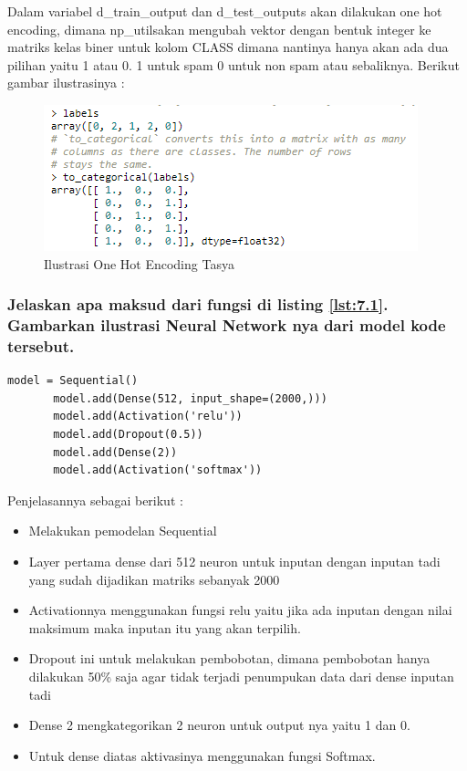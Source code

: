 Dalam variabel d\_train\_output dan d\_test\_outputs akan dilakukan one hot encoding, dimana np\_utilsakan mengubah vektor dengan bentuk integer ke matriks kelas biner untuk kolom CLASS dimana nantinya hanya akan ada dua pilihan yaitu 1 atau 0. 1 untuk spam 0 untuk non spam atau sebaliknya. Berikut gambar ilustrasinya :\\
\begin{figure}[ht]
\centering
\includegraphics[scale=0.5]{figures/Chapter 7/1164086/Teori/chapter7tasya5.png}
\caption{Ilustrasi One Hot Encoding Tasya}
\label{Teori}
\end{figure}

\subsubsection{Jelaskan apa maksud dari fungsi di listing \ref{lst:7.1}. Gambarkan ilustrasi Neural Network nya dari model kode tersebut.}
\begin{lstlisting}[caption=Membuat model Neural Network,label={lst:7.1}]
       model = Sequential()
       model.add(Dense(512, input_shape=(2000,)))
       model.add(Activation('relu'))
       model.add(Dropout(0.5))
       model.add(Dense(2))
       model.add(Activation('softmax'))
\end{lstlisting}
Penjelasannya sebagai berikut :\\
\begin{itemize}
\item Melakukan pemodelan Sequential
\item Layer pertama dense dari 512 neuron untuk inputan dengan inputan tadi yang sudah dijadikan matriks sebanyak 2000
\item Activationnya menggunakan fungsi relu yaitu jika ada inputan dengan nilai maksimum maka inputan itu yang akan terpilih.
\item Dropout ini untuk melakukan pembobotan, dimana pembobotan hanya dilakukan 50\% saja agar tidak terjadi penumpukan data dari dense inputan tadi
\item Dense 2 mengkategorikan 2 neuron untuk output nya yaitu 1 dan 0.
\item Untuk dense diatas aktivasinya menggunakan fungsi Softmax.
\end{itemize}

